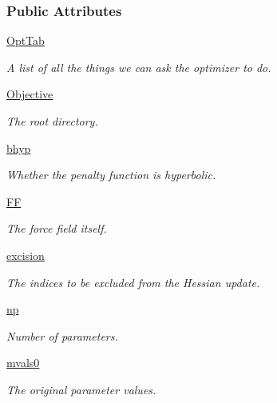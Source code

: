 \subsubsection*{\-Public \-Attributes}
\begin{DoxyCompactItemize}
\item 
\hyperlink{classforcebalance_1_1optimizer_1_1Optimizer_acd9866c0bb48a8f49f2dca1d83441bde}{\-Opt\-Tab}
\begin{DoxyCompactList}\small\item\em \-A list of all the things we can ask the optimizer to do. \end{DoxyCompactList}\item 
\hyperlink{classforcebalance_1_1optimizer_1_1Optimizer_ab43692f45372b27e41046aa4a40396f1}{\-Objective}
\begin{DoxyCompactList}\small\item\em \-The root directory. \end{DoxyCompactList}\item 
\hyperlink{classforcebalance_1_1optimizer_1_1Optimizer_a45f221523fe7b5b869967d7640b49864}{bhyp}
\begin{DoxyCompactList}\small\item\em \-Whether the penalty function is hyperbolic. \end{DoxyCompactList}\item 
\hyperlink{classforcebalance_1_1optimizer_1_1Optimizer_a309b7d86a8f67f679efe427b1c5cd0cb}{\-F\-F}
\begin{DoxyCompactList}\small\item\em \-The force field itself. \end{DoxyCompactList}\item 
\hyperlink{classforcebalance_1_1optimizer_1_1Optimizer_aed81fe7ecd916992d1c545ed80c065dd}{excision}
\begin{DoxyCompactList}\small\item\em \-The indices to be excluded from the \-Hessian update. \end{DoxyCompactList}\item 
\hyperlink{classforcebalance_1_1optimizer_1_1Optimizer_a482102f9a8fc0fa5120db5078684fb53}{np}
\begin{DoxyCompactList}\small\item\em \-Number of parameters. \end{DoxyCompactList}\item 
\hyperlink{classforcebalance_1_1optimizer_1_1Optimizer_a2b9976e6502107bc6d11868e9b6ddf75}{mvals0}
\begin{DoxyCompactList}\small\item\em \-The original parameter values. \end{DoxyCompactList}\item 

\end{DoxyCompactItemize}
